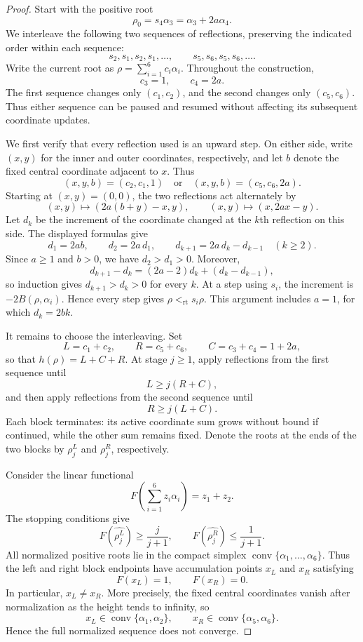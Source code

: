 \documentclass[11pt,reqno]{amsart}
\theoremstyle{plain}
\theoremstyle{definition}
\theoremstyle{remark}
\numberwithin{equation}{section}
\begin{document}
\begin{proof}
Start with the positive root
\[
\rho_0=s_4\alpha_3=\alpha_3+2a\alpha_4.
\]
We interleave the following two sequences of reflections, preserving
the indicated order within each sequence:
\[
s_2,s_1,s_2,s_1,\ldots,
\qquad
s_5,s_6,s_5,s_6,\ldots.
\]
Write the current root as $\rho=\sum_{i=1}^6 c_i\alpha_i$.
Throughout the construction,
\[
c_3=1,\qquad c_4=2a.
\]
The first sequence changes only $(c_1,c_2)$, and the second
changes only $(c_5,c_6)$. Thus either sequence can be paused
and resumed without affecting its subsequent coordinate updates.

We first verify that every reflection used is an upward step.
On either side, write $(x,y)$ for the inner and outer coordinates,
respectively, and let $b$ denote the fixed central coordinate
adjacent to $x$. Thus
\[
(x,y,b)=(c_2,c_1,1)
\quad\text{or}\quad
(x,y,b)=(c_5,c_6,2a).
\]
Starting at $(x,y)=(0,0)$, the two reflections act alternately by
\[
(x,y)\longmapsto(2a(b+y)-x,y),
\qquad
(x,y)\longmapsto(x,2ax-y).
\]
Let $d_k$ be the increment of the coordinate changed at the
$k$th reflection on this side. The displayed formulas give
\[
d_1=2ab,\qquad d_2=2a\,d_1,\qquad
d_{k+1}=2a\,d_k-d_{k-1}\quad(k\geq2).
\]
Since $a\geq1$ and $b>0$, we have $d_2>d_1>0$. Moreover,
\[
d_{k+1}-d_k
=(2a-2)d_k+(d_k-d_{k-1}),
\]
so induction gives $d_{k+1}>d_k>0$ for every $k$.
At a step using $s_i$, the increment is $-2B(\rho,\alpha_i)$.
Hence every step gives $\rho<_{\mathrm{rt}}s_i\rho$.
This argument includes $a=1$, for which $d_k=2bk$.

It remains to choose the interleaving. Set
\[
L=c_1+c_2,\qquad R=c_5+c_6,\qquad C=c_3+c_4=1+2a,
\]
so that $h(\rho)=L+C+R$.
At stage $j\geq1$, apply reflections from the first sequence
until
\[
L\geq j(R+C),
\]
and then apply reflections from the second sequence until
\[
R\geq j(L+C).
\]
Each block terminates: its active coordinate sum grows without
bound if continued, while the other sum remains fixed.
Denote the roots at the ends of the two blocks by
$\rho_j^{L}$ and $\rho_j^{R}$, respectively.

Consider the linear functional
\[
F\left(\sum_{i=1}^6 z_i\alpha_i\right)=z_1+z_2.
\]
The stopping conditions give
\[
F(\widehat{\rho_j^{L}})\geq\frac{j}{j+1},
\qquad
F(\widehat{\rho_j^{R}})\leq\frac{1}{j+1}.
\]
All normalized positive roots lie in the compact simplex
$\operatorname{conv}\{\alpha_1,\ldots,\alpha_6\}$.
Thus the left and right block endpoints have accumulation
points $x_L$ and $x_R$ satisfying
\[
F(x_L)=1,\qquad F(x_R)=0.
\]
In particular, $x_L\neq x_R$. More precisely, the fixed central
coordinates vanish after normalization as the height tends to
infinity, so
\[
x_L\in\operatorname{conv}\{\alpha_1,\alpha_2\},
\qquad
x_R\in\operatorname{conv}\{\alpha_5,\alpha_6\}.
\]
Hence the full normalized sequence does not converge.
\end{proof}
\end{document}
